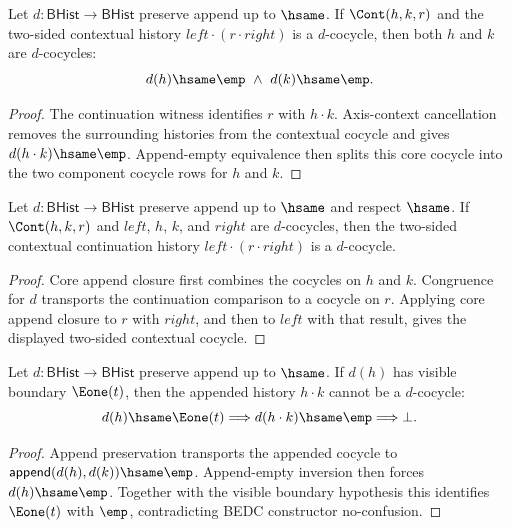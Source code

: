 \begin{theorem}
\label{thm:cohomology-cocycle-continuation-axis-context-cancel}
Let $d:\mathsf{BHist}\to\mathsf{BHist}$ preserve append up to $\hsame$. If
$\Cont(h,k,r)$ and the two-sided contextual history
$left\cdot(r\cdot right)$ is a $d$-cocycle, then both $h$ and $k$ are
$d$-cocycles:
$$
d(h)\hsame\emp\ \wedge\ d(k)\hsame\emp.
$$
\end{theorem}
\begin{proof}
The continuation witness identifies $r$ with $h\cdot k$. Axis-context
cancellation removes the surrounding histories from the contextual cocycle and
gives $d(h\cdot k)\hsame\emp$. Append-empty equivalence then splits this core
cocycle into the two component cocycle rows for $h$ and $k$.
\end{proof}

\begin{theorem}
\label{thm:cohomology-cocycle-continuation-axis-context-closed}
Let $d:\mathsf{BHist}\to\mathsf{BHist}$ preserve append up to $\hsame$ and
respect $\hsame$. If $\Cont(h,k,r)$ and $left$, $h$, $k$, and $right$ are
$d$-cocycles, then the two-sided contextual continuation history
$left\cdot(r\cdot right)$ is a $d$-cocycle.
\end{theorem}
\begin{proof}
Core append closure first combines the cocycles on $h$ and $k$. Congruence
for $d$ transports the continuation comparison to a cocycle on $r$. Applying
core append closure to $r$ with $right$, and then to $left$ with that result,
gives the displayed two-sided contextual cocycle.
\end{proof}

\begin{theorem}
\label{thm:cohomology-cocycle-append-left-e1-boundary-empty-absurd}
Let $d:\mathsf{BHist}\to\mathsf{BHist}$ preserve append up to $\hsame$. If
$d(h)$ has visible boundary $\Eone(t)$, then the appended history $h\cdot k$
cannot be a $d$-cocycle:
$$
d(h)\hsame\Eone(t)\Longrightarrow d(h\cdot k)\hsame\emp\Longrightarrow\bot.
$$
\end{theorem}
\begin{proof}
Append preservation transports the appended cocycle to
$\mathsf{append}(d(h),d(k))\hsame\emp$. Append-empty inversion then forces
$d(h)\hsame\emp$. Together with the visible boundary hypothesis this identifies
$\Eone(t)$ with $\emp$, contradicting BEDC constructor no-confusion.
\end{proof}

